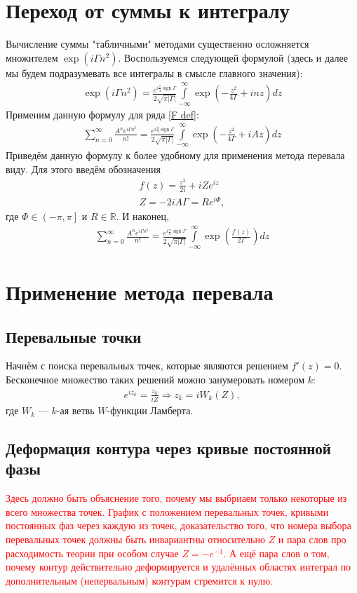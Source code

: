 \documentclass[a4paper, 12pt]{article}
\DeclareMathOperator*{\sign}{sign}
\newenvironment{eqw}{\begin{equation} \begin{aligned}}   
    {\end{aligned}    \end{equation}}
\begin{document}
\section*{Переход от суммы к интегралу}
Вычисление суммы "табличными" методами существенно осложняется множителем $\exp\left(i\Gamma n^2\right)$. Воспользуемся следующей формулой (здесь и далее мы будем подразумевать все интегралы в смысле главного значения):
\begin{eqw}
    \exp\left(i\Gamma n^2\right) = \frac{e^{i\frac{\pi}{4}\sign \Gamma}}{2\sqrt{\pi|\Gamma|}}
    \int\limits_{-\infty}^{\infty} \exp\left(-\frac{z^2}{4\Gamma} + i n z\right) dz
\end{eqw}
Применим данную формулу для ряда \ref{F def}:
\begin{eqw}
    \sum\limits_{n=0}^{\infty} \frac{A^n e^{i\Gamma n^2}}{n!} = \frac{e^{i\frac{\pi}{4}\sign \Gamma}}{2\sqrt{\pi|\Gamma|}}
    \int\limits_{-\infty}^{\infty} \exp\left(-\frac{z^2}{4\Gamma} + i A z\right) dz
\end{eqw}
Приведём данную формулу к более удобному для применения метода перевала виду. Для этого введём обозначения
\begin{eqw}
    f(z) =  \frac{z^2}{2i} + i Z e^{iz}\\
    Z = -2i A \Gamma = R e^{i\Phi},
\end{eqw}
где $\Phi\in\left(-\pi, \pi\right]$ и $R\in\mathbb{R}$. И наконец, 
\begin{eqw}
    \sum\limits_{n=0}^{\infty} \frac{A^n e^{i\Gamma n^2}}{n!} = \frac{e^{i\frac{\pi}{4}\sign \Gamma}}{2\sqrt{\pi|\Gamma|}}
    \int\limits_{-\infty}^{\infty}\exp\left(\frac{f(z)}{2\Gamma}\right)dz 
\end{eqw}

\section*{Применение метода перевала}
\subsection*{Перевальные точки}
Начнём с поиска перевальных точек, которые являются решением $f'(z)=0$. Бесконечное множество таких решений можно занумеровать номером $k$:
\begin{eqw}
    e^{i z_k} = \frac{z_k}{iZ} \Rightarrow   z_k = i W_k(Z),
\end{eqw}
где $W_k$ --- $k$-ая ветвь $W$-функции Ламберта. 
\subsection*{Деформация контура через кривые постоянной фазы}
\textcolor{red}{Здесь должно быть объяснение того, почему мы выбриаем только некоторые из всего множества точек. График с положением перевальных точек, кривыми постоянных фаз через каждую из точек, доказательство того, что номера выбора перевальных точек должны быть инвариантны относительно $Z$ и пара слов про расходимость теории при особом случае $Z=-e^{-1}$. А ещё пара слов о том, почему контур действительно деформируется и удалённых областях интеграл по дополнительным (непервальным) контурам стремится к нулю.}
\end{document}
